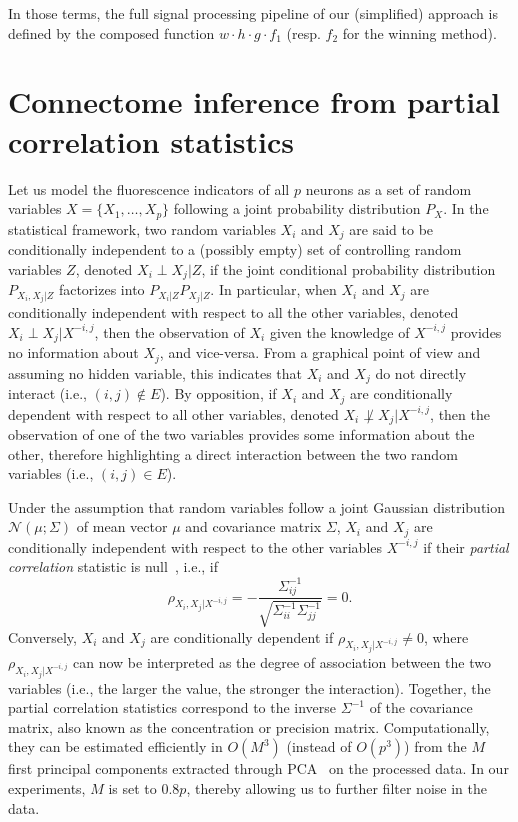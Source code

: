 \documentclass[wcp]{jmlr}
\begin{document}
In those terms, the full signal processing pipeline of our (simplified)
approach is defined by the composed function $w \cdot h \cdot g \cdot f_1$
(resp. $f_2$ for the winning method).


\section{Connectome inference from partial correlation statistics}
\label{sec:inference}

Let us model the fluorescence indicators of all $p$ neurons as a set of random
variables $X = \{X_1, \dots, X_p\}$ following a joint probability distribution
$P_X$. In the statistical framework, two random variables $X_i$ and $X_j$ are
said to be conditionally independent to a (possibly empty) set of controlling
random variables $Z$, denoted $X_i \perp X_j | Z$, if the joint conditional
probability distribution $P_{X_i, X_j | Z}$ factorizes into $P_{X_i|Z}
P_{X_j|Z}$. In particular, when $X_i$ and $X_j$ are conditionally independent
with respect to all the other variables, denoted $X_i \perp X_j | X^{-i,j}$, then the
observation of $X_i$ given the knowledge of $X^{-i,j}$ provides no information
about $X_j$, and vice-versa. From a graphical point of view and assuming no
hidden variable, this indicates that $X_i$ and $X_j$ do not directly interact
(i.e., $(i,j) \notin E$). By opposition, if $X_i$ and $X_j$ are conditionally
dependent with respect to all other variables, denoted $X_i \not\perp X_j |
X^{-i,j}$, then the observation of one of the two variables provides some
information about the other, therefore highlighting a direct interaction
between the two random variables (i.e., $(i, j) \in E$).

Under the assumption that random variables follow a joint Gaussian
distribution $\mathcal{N}(\mu; \Sigma)$ of mean vector $\mu$ and covariance
matrix $\Sigma$, $X_i$ and $X_j$ are conditionally independent with respect to
the other variables $X^{-i,j}$ if their \textit{partial correlation} statistic
is null~\citep{koller2009probabilistic}, i.e., if
\begin{equation}
\rho_{X_i, X_j | X^{-i,j}} = -\frac{\Sigma^{-1}_{ij}}{\sqrt{\Sigma^{-1}_{ii} \Sigma^{-1}_{jj}}} = 0.
\end{equation}
Conversely, $X_i$ and $X_j$ are conditionally dependent if $\rho_{X_i, X_j | X^{-i,j}} \neq 0$,
where $\rho_{X_i, X_j | X^{-i,j}}$ can now be interpreted as the degree of association
between the two variables (i.e., the larger the value, the stronger the interaction).
Together, the partial correlation statistics correspond to the inverse
$\Sigma^{-1}$ of the covariance matrix, also known as the concentration or
precision matrix. Computationally, they can be estimated efficiently in
$O(M^3)$ (instead of $O(p^3)$) from the $M$ first principal components
extracted through PCA~\citep{bishop2006pattern} on the processed data. In our experiments, $M$ is set
to $0.8 p$, thereby allowing us to further filter noise in the data.
\end{document}
